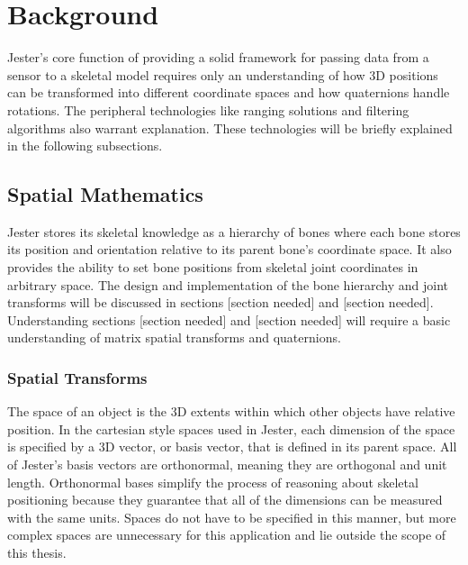 \chapter{Background}

Jester’s core function of providing a solid framework for passing data from a sensor to a skeletal model requires only an understanding of how 3D positions can be transformed into different coordinate spaces and how quaternions handle rotations. The peripheral technologies like ranging solutions and filtering algorithms also warrant explanation. These technologies will be briefly explained in the following subsections.

\section{Spatial Mathematics}

Jester stores its skeletal knowledge as a hierarchy of bones where each bone stores its position and orientation relative to its parent bone’s coordinate space. It also provides the ability to set bone positions from skeletal joint coordinates in arbitrary space. The design and implementation of the bone hierarchy and joint transforms will be discussed in sections [section needed] and [section needed]. Understanding sections [section needed] and [section needed] will require a basic understanding of matrix spatial transforms and quaternions.

\subsection{Spatial Transforms}

The space of an object is the 3D extents within which other objects have relative position. In the cartesian style spaces used in Jester, each dimension of the space is specified by a 3D vector, or basis vector, that is defined in its parent space. All of Jester’s basis vectors are orthonormal, meaning they are orthogonal and unit length. Orthonormal bases simplify the process of reasoning about skeletal positioning because they guarantee that all of the dimensions can be measured with the same units. Spaces do not have to be specified in this manner, but more complex spaces are unnecessary for this application and lie outside the scope of this thesis. 

